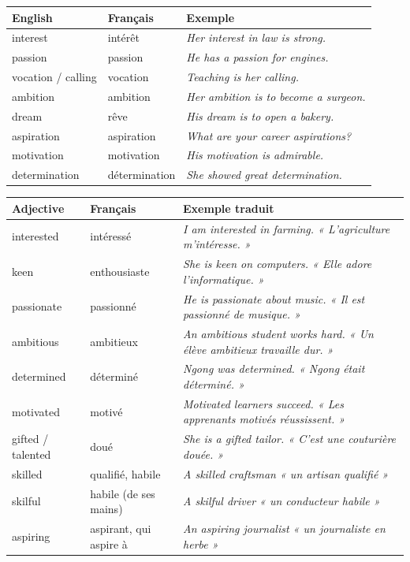 \documentclass[11pt]{article}
\newcommand{\eng}[1]{\ifmmode\text{\textit{#1}}\else\begingroup\selectlanguage{english}\itshape #1\endgroup\fi}
\begin{document}
\begin{center}
\begin{tabularx}{\linewidth}{|X|X|X|}
\hline
\rowcolor{popblueL} English & Français & Exemple \\
\hline
interest & intérêt & \eng{Her interest in law is strong.} \\
\hline
passion & passion & \eng{He has a passion for engines.} \\
\hline
vocation / calling & vocation & \eng{Teaching is her calling.} \\
\hline
ambition & ambition & \eng{Her ambition is to become a surgeon.} \\
\hline
dream & rêve & \eng{His dream is to open a bakery.} \\
\hline
aspiration & aspiration & \eng{What are your career aspirations?} \\
\hline
motivation & motivation & \eng{His motivation is admirable.} \\
\hline
determination & détermination & \eng{She showed great determination.} \\
\hline
\end{tabularx}
\end{center}

\begin{center}
\begin{tabularx}{\linewidth}{|X|X|X|}
\hline
\rowcolor{popgreenL} Adjective & Français & Exemple traduit \\
\hline
interested & intéressé & \eng{I am interested in farming.} « L'agriculture m'intéresse. » \\
\hline
keen & enthousiaste & \eng{She is keen on computers.} « Elle adore l'informatique. » \\
\hline
passionate & passionné & \eng{He is passionate about music.} « Il est passionné de musique. » \\
\hline
ambitious & ambitieux & \eng{An ambitious student works hard.} « Un élève ambitieux travaille dur. » \\
\hline
determined & déterminé & \eng{Ngong was determined.} « Ngong était déterminé. » \\
\hline
motivated & motivé & \eng{Motivated learners succeed.} « Les apprenants motivés réussissent. » \\
\hline
gifted / talented & doué & \eng{She is a gifted tailor.} « C'est une couturière douée. » \\
\hline
skilled & qualifié, habile & \eng{A skilled craftsman} « un artisan qualifié » \\
\hline
skilful & habile (de ses mains) & \eng{A skilful driver} « un conducteur habile » \\
\hline
aspiring & aspirant, qui aspire à & \eng{An aspiring journalist} « un journaliste en herbe » \\
\hline
\end{tabularx}
\end{center}
\end{document}
